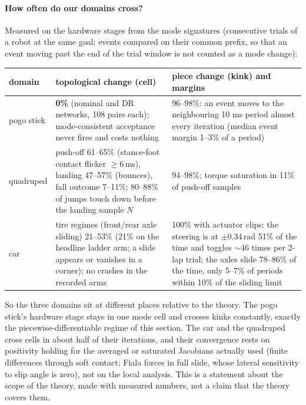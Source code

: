 \documentclass[11pt]{article}
\theoremstyle{definition}
\theoremstyle{remark}
\begin{document}
\paragraph{How often do our domains cross?} Measured on the hardware stages from the mode signatures (consecutive
trials of a robot at the same goal; events compared on their common prefix, so that an event moving past the end of the
trial window is not counted as a mode change):
\begin{center}
\begin{tabular}{@{}p{}p{}p{}@{}}
\toprule
domain & topological change (cell) & piece change (kink) and margins\\
\midrule
pogo stick & \textbf{0\%} (nominal and DR networks, 108 pairs each); mode-consistent acceptance never fires and costs
nothing & 96--98\%: an event moves to the neighbouring 10 ms period almost every iteration (median event margin 1--3\% of a
period)\\
quadruped & push-off 61--65\% (stance-foot contact flicker $\ge6$\,ms), landing 47--57\% (bounces), fall outcome 7--11\%;
80--88\% of jumps touch down before the landing sample $N$ & 94--98\%; torque saturation in 11\% of push-off samples\\
car & tire regimes (front/rear axle sliding) 21--53\% (21\% on the headline ladder arm; a slide appears or vanishes in a corner); no crashes in the
recorded arms & 100\% with actuator clips: the steering is at $\pm0.34$\,rad 51\% of the time and toggles $\sim$46 times per
2-lap trial; the axles slide 78--86\% of the time, only 5--7\% of periods within 10\% of the sliding limit\\
\bottomrule
\end{tabular}
\end{center}
So the three domains sit at different places relative to the theory. The pogo stick's hardware stage stays in one mode
cell and crosses kinks constantly, exactly the piecewise-differentiable regime of this section. The car and the
quadruped cross cells in about half of their iterations, and their convergence rests on positivity holding for the
averaged or saturated Jacobians actually used (finite differences through soft contact; Fiala forces in full slide,
whose lateral sensitivity to slip angle is zero), not on the local analysis. This is a statement about the scope of the
theory, made with measured numbers, not a claim that the theory covers them.
\end{document}
